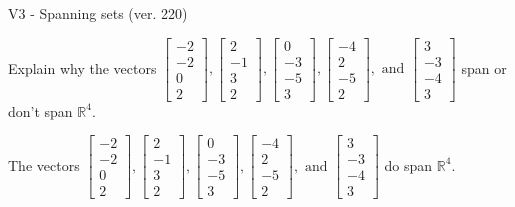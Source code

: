 \begin{exercise}
  \begin{exerciseTitle}V3 - Spanning sets (ver. 220)\end{exerciseTitle}
  \begin{exerciseStatement}
    Explain why the vectors \(\left[\begin{array}{r}
-2 \\
-2 \\
0 \\
2
\end{array}\right] , \left[\begin{array}{r}
2 \\
-1 \\
3 \\
2
\end{array}\right] , \left[\begin{array}{r}
0 \\
-3 \\
-5 \\
3
\end{array}\right] , \left[\begin{array}{r}
-4 \\
2 \\
-5 \\
2
\end{array}\right] , \text{ and } \left[\begin{array}{r}
3 \\
-3 \\
-4 \\
3
\end{array}\right]\) span or don't span \(\mathbb{R}^4\). 
	


  \end{exerciseStatement}
  \begin{exerciseAnswer}
   The vectors \(\left[\begin{array}{r}
-2 \\
-2 \\
0 \\
2
\end{array}\right] , \left[\begin{array}{r}
2 \\
-1 \\
3 \\
2
\end{array}\right] , \left[\begin{array}{r}
0 \\
-3 \\
-5 \\
3
\end{array}\right] , \left[\begin{array}{r}
-4 \\
2 \\
-5 \\
2
\end{array}\right] , \text{ and } \left[\begin{array}{r}
3 \\
-3 \\
-4 \\
3
\end{array}\right]\) 
  	 do  
	span \(\mathbb{R}^4\).
  



\end{exerciseAnswer}
\end{exercise}
